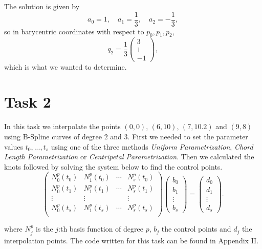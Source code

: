 \documentclass[]{article}
\begin{document}
The solution is given by \begin{equation*}
a_0 = 1, \quad a_1 = \frac{1}{3}, \quad a_2 = -\frac{1}{3},
\end{equation*}
so in barycentric coordinates with respect to $p_0, p_1, p_2$, \begin{equation*}
q_2 = \frac{1}{3}\left(\begin{array}{r}
3\\
1\\
-1
\end{array}\right),
\end{equation*}
which is what we wanted to determine.

\section*{Task 2}
In this task we interpolate the points $(0,0)$, $(6,10)$, $(7,10.2)$ and $(9,8)$ using B-Spline curves of degree $2$ and $3$. First we needed to set the parameter values $t_0,...,t_s$ using one of the three methods \textit{Uniform Parametrization}, \textit{Chord Length Parametrization} or \textit{Centripetal Parametrization}. Then we calculated the knots followed by solving the system below to find the control points.
\begin{equation*}
\left(\begin{array}{cccc}
N^p_0(t_0) & N^p_1(t_0) & \cdots & N^p_s(t_0)\\
N^p_0(t_1) & N^p_1(t_1) & \cdots & N^p_s(t_1)\\
\vdots & \vdots & & \vdots\\
N^p_0(t_s) & N^p_1(t_s) & \cdots & N^p_s(t_s)\\
\end{array}\right)\left(\begin{array}{c}
b_0\\
b_1\\
\vdots \\
b_s
\end{array}\right) = \left(\begin{array}{c}
d_0\\
d_1\\
\vdots \\
d_s
\end{array}\right).
\end{equation*}

where $N^p_j$ is the $j$:th basis function of degree $p$, $b_j$ the control points and $d_j$ the interpolation points. The code written for this task can be found in Appendix II.
\end{document}
